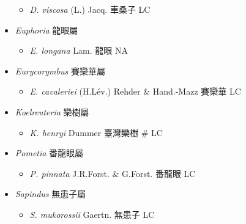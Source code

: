 \begin{itemize}
  \begin{itemize}
        \item[] \textit{D. viscosa} (L.) Jacq.  車桑子   LC
  \end{itemize}
 \item[] \textit{Euphoria} 龍眼屬
                                
  \begin{itemize}
        \item[] \textit{E. longana} Lam.  龍眼   NA
  \end{itemize}
 \item[] \textit{Eurycorymbus} 賽欒華屬
                                
  \begin{itemize}
        \item[] \textit{E. cavaleriei} (H.Lév.) Rehder \& Hand.-Mazz  賽欒華   LC
  \end{itemize}
 \item[] \textit{Koelreuteria} 欒樹屬
                                
  \begin{itemize}
        \item[] \textit{K. henryi} Dummer  臺灣欒樹  \# LC
  \end{itemize}
 \item[] \textit{Pometia} 番龍眼屬
                                
  \begin{itemize}
        \item[] \textit{P. pinnata} J.R.Forst. \& G.Forst.  番龍眼   LC
  \end{itemize}
 \item[] \textit{Sapindus} 無患子屬
                                
  \begin{itemize}
        \item[] \textit{S. mukorossii} Gaertn.  無患子   LC
  \end{itemize}
  \end{itemize}
